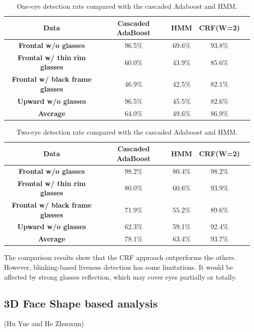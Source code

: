 \documentclass[journal]{IEEEtran}
\begin{document}
\begin{table}[!htbp]
\centering
\caption{One-eye detection rate compared with the cascaded Adaboost and HMM.}
\label{tab_D_1}
\begin{tabular}{ccccc}
\toprule
\textbf{Data} & Cascaded AdaBoost & HMM &  CRF(W=2) \\
\midrule
\textbf{Frontal w/o glasses} & 96.5\% & 69.6\% & 93.8\% \\
\textbf{Frontal w/ thin rim glasses} & 60.0\% & 43.9\% & 85.6\% \\
\textbf{Frontal w/ black frame glasses} & 46.9\% & 42.5\% & 82.1\% \\
\textbf{Upward w/o glasses} & 96.5\% & 45.5\% & 82.6\% \\
\midrule
\textbf{Average} & 64.0\% & 49.6\% & 86.9\% \\
\bottomrule
\end{tabular}
\end{table}

\begin{table}[!htbp]
\centering
\caption{Two-eye detection rate compared with the cascaded Adaboost and HMM.}
\label{tab_D_2}
\begin{tabular}{ccccc}
\toprule
\textbf{Data} & Cascaded AdaBoost & HMM &  CRF(W=2) \\
\midrule
\textbf{Frontal w/o glasses} & 98.2\% & 80.4\% & 98.2\% \\
\textbf{Frontal w/ thin rim glasses} & 80.0\% & 60.6\% & 93.9\% \\
\textbf{Frontal w/ black frame glasses} & 71.9\% & 55.2\% & 89.6\% \\
\textbf{Upward w/o glasses} & 62.3\% & 59.1\% & 92.4\% \\
\midrule
\textbf{Average} & 78.1\% & 63.4\% & 93.7\% \\
\bottomrule
\end{tabular}
\end{table}

The comparison results show that the CRF approach outperforms the others. However, blinking-based liveness detection has some limitations. It would be affected by strong glasses reflection, which may cover eyes partially or totally.

\subsection{3D Face Shape based analysis}

(Hu Yue and He Zhuoxun)
\end{document}
